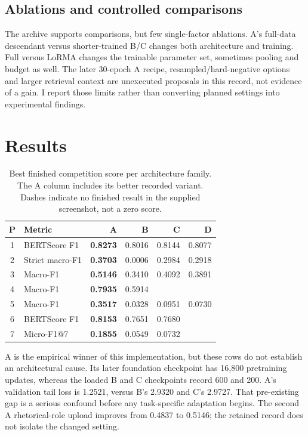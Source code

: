\documentclass[11pt, oneside]{article}
\newcommand{\NA}{\textemdash}
\newcommand{\mainbreak}{\clearpage}
\begin{document}
\subsection{Ablations and controlled comparisons}
The archive supports comparisons, but few single-factor ablations. A's full-data descendant versus
shorter-trained B/C changes both architecture and training. Full versus LoRMA changes the trainable
parameter set, sometimes pooling and budget as well. The later 30-epoch A recipe, resampled/hard-negative
options and larger retrieval context are unexecuted proposals in this record, not evidence of a gain.
I report those limits rather than converting planned settings into experimental findings.

\mainbreak
\section{Results}
\begin{table}[H]\centering\small
\caption{Best finished competition score per architecture family. The A column includes its better
recorded variant. Dashes indicate no finished result in the supplied screenshot, not a zero score.}
\label{tab:family}
\begin{tabular}{clrrrr}
\toprule P & Metric & A & B & C & D\\\midrule
1 & BERTScore F1 & \textbf{0.8273} & 0.8016 & 0.8144 & 0.8077\\
2 & Strict macro-F1 & \textbf{0.3703} & 0.0006 & 0.2984 & 0.2918\\
3 & Macro-F1 & \textbf{0.5146} & 0.3410 & 0.4092 & 0.3891\\
4 & Macro-F1 & \textbf{0.7935} & 0.5914 & \NA & \NA\\
5 & Macro-F1 & \textbf{0.3517} & 0.0328 & 0.0951 & 0.0730\\
6 & BERTScore F1 & \textbf{0.8153} & 0.7651 & 0.7680 & \NA\\
7 & Micro-F1@7 & \textbf{0.1855} & 0.0549 & 0.0732 & \NA\\\bottomrule
\end{tabular}\end{table}

A is the empirical winner of this implementation, but these rows do not establish an architectural cause.
Its later foundation checkpoint has 16,800 pretraining updates, whereas the loaded B and C checkpoints
record 600 and 200. A's validation tail loss is 1.2521, versus B's 2.9320 and C's 2.9727. That pre-existing
gap is a serious confound before any task-specific adaptation begins. The second A rhetorical-role
upload improves from 0.4837 to 0.5146; the retained record does not isolate the changed setting.
\end{document}
